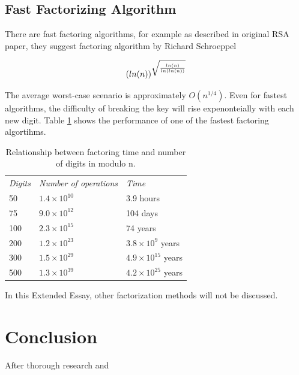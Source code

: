 \documentclass[a4paper, 12pt]{article}
\begin{document}
\subsection{Fast Factorizing Algorithm}
\label{bsec:fast}

There are fast factoring algorithms, for example as described in original RSA paper\cite{rsapaper},
they suggest factoring algorithm by Richard Schroeppel

\begin{equation}
  (ln(n))^{\sqrt{\frac{ln(n)}{ln(ln(n))}}}\\
  \end{equation}

The average worst-case scenario is approximately $O(n^{1/4})$. Even for fastest algorithms, the difficulty
of breaking the key will rise expenonteially with each new digit. Table \ref{table:rsa} shows the performance of one of the fastest factoring algortihms.

\begin{table}
  \begin{center}
    \begin{tabular}{l l l}
    \textit{Digits} & \textit{Number of operations} & \textit{Time}\\
    50 & $1.4 \times 10^{10}$ & 3.9 hours\\
    75 & $9.0 \times 10^{12}$ & 104 days\\
    100 & $2.3 \times 10^{15}$ & 74 years\\
    200 & $1.2 \times 10^{23}$ & $3.8 \times 10^9$ years\\
    300 & $1.5 \times 10^{29}$ & $4.9 \times 10^{15}$ years\\
    500 & $1.3 \times 10^{39}$ & $4.2 \times 10^{25}$ years\\
    \end{tabular}
  \caption{Relationship between factoring time and number of digits in modulo n.\cite{rsapaper}}
  \label{table:rsa}
  \end{center}
  \end{table}

In this Extended Essay, other factorization methods will not be discussed.

\newpage

\section{Conclusion}

After thorough research and 
\end{document}
